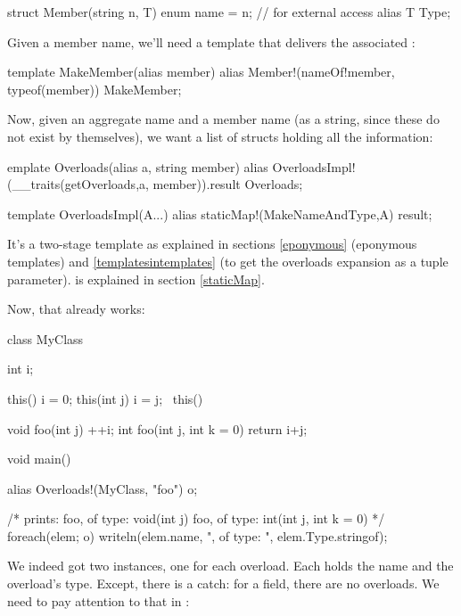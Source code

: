 
\begin{dcode}
struct Member(string n, T)
{
    enum name = n; // for external access
    alias T Type;
}
\end{dcode}

Given a member name, we'll need a template that delivers the associated :

\begin{dcode}
template MakeMember(alias member)
{
    alias Member!(nameOf!member, typeof(member)) MakeMember;
}
\end{dcode}

Now, given an aggregate name and a member name (as a string, since these do not exist by themselves), we want a list of  structs holding all the information:

\begin{dcode}
emplate Overloads(alias a, string member)
{
    alias OverloadsImpl!(__traits(getOverloads,a, member)).result Overloads;
}

template OverloadsImpl(A...)
{
    alias staticMap!(MakeNameAndType,A) result;
}
\end{dcode}

It's a two-stage template as explained in sections \ref{eponymous} (eponymous templates) and \ref{templatesintemplates} (to get the overloads expansion as a tuple parameter).  is explained in section \ref{staticMap}.

Now, that already works:

\begin{dcode}
class MyClass 
{
    int i;
    
    this() { i = 0;}
    this(int j) { i = j;}
    ~this() { }
    
    void foo(int j) { ++i;}
    int foo(int j, int k = 0) { return i+j;}
}

void main()
{
    alias Overloads!(MyClass, "foo") o;
    
    /* 
    prints:
    foo, of type: void(int j)
    foo, of type: int(int j, int k = 0)
    */
    foreach(elem; o) 
        writeln(elem.name, ", of type: ", elem.Type.stringof);
}
\end{dcode}

We indeed got two  instances, one for each overload. Each  holds the name  and the overload's type. Except, there is a catch: for a field, there are no overloads. We need to pay attention to that in :

